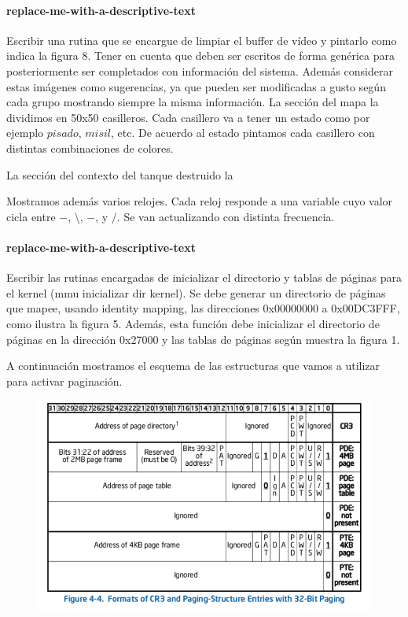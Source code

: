 \paragraph{replace-me-with-a-descriptive-text}\label{subsubsec:ej3-a}
Escribir una rutina que se encargue de limpiar el buffer de vídeo y pintarlo
como indica la figura 8. Tener en cuenta que deben ser escritos de forma
genérica para posteriormente ser completados con información del sistema. Además
considerar estas imágenes como sugerencias, ya que pueden ser modificadas a
gusto según cada grupo mostrando siempre la misma información.
\hruler
La sección del mapa la dividimos en 50x50 casilleros. Cada casillero va a tener un estado como por ejemplo $pisado$, $misil$, etc. De acuerdo al
estado pintamos cada casillero con distintas combinaciones de colores.

La sección del contexto del tanque destruido la 

Mostramos además varios relojes. Cada reloj responde a una variable cuyo valor cicla entre $-$, \textbackslash, $-$, y $/$. Se van actualizando 
con distinta frecuencia.

\paragraph{replace-me-with-a-descriptive-text}\label{subsubsec:ej3-b}
Escribir las rutinas encargadas de inicializar el directorio y tablas de páginas
para el kernel (mmu inicializar dir kernel). Se debe generar un directorio de
páginas que mapee, usando identity mapping, las direcciones 0x00000000 a
0x00DC3FFF, como ilustra la figura 5. Además, esta función debe inicializar el
directorio de páginas en la dirección 0x27000 y las tablas de páginas según
muestra la figura 1.
\hruler

A continuación mostramos el esquema de las estructuras que vamos a utilizar para activar paginación.

\begin{figure}[H]
\begin{center}
\includegraphics[scale=.5]{imagenes/paginacion.png}
\end{center}
\end{figure}

